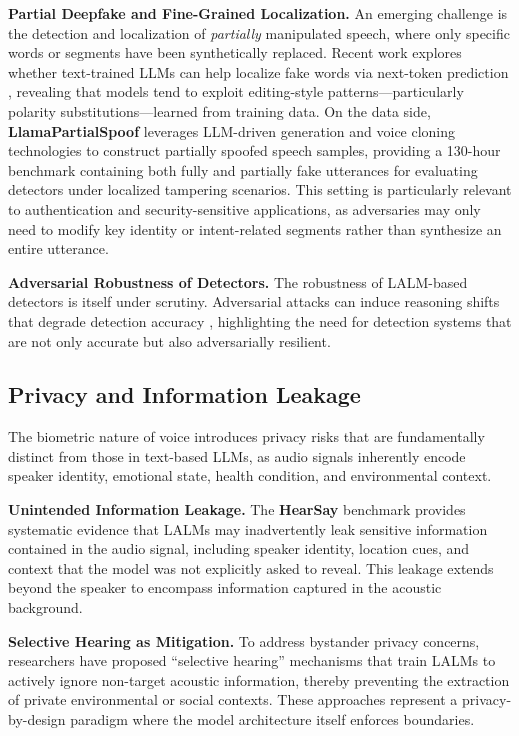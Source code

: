 \textbf{Partial Deepfake and Fine-Grained Localization.} An emerging challenge is the detection and localization of \textit{partially} manipulated speech, where only specific words or segments have been synthetically replaced. Recent work explores whether text-trained LLMs can help localize fake words via next-token prediction \cite{zhang2026can}, revealing that models tend to exploit editing-style patterns---particularly polarity substitutions---learned from training data. On the data side, \textbf{LlamaPartialSpoof} \cite{luong2025llamapartialspoof} leverages LLM-driven generation and voice cloning technologies to construct partially spoofed speech samples, providing a 130-hour benchmark containing both fully and partially fake utterances for evaluating detectors under localized tampering scenarios. This setting is particularly relevant to authentication and security-sensitive applications, as adversaries may only need to modify key identity or intent-related segments rather than synthesize an entire utterance.
 
\textbf{Adversarial Robustness of Detectors.} The robustness of LALM-based detectors is itself under scrutiny. Adversarial attacks can induce reasoning shifts that degrade detection accuracy \cite{nguyen2026analyzing}, highlighting the need for detection systems that are not only accurate but also adversarially resilient.

\subsection{Privacy and Information Leakage}
The biometric nature of voice introduces privacy risks that are fundamentally distinct from those in text-based LLMs, as audio signals inherently encode speaker identity, emotional state, health condition, and environmental context.

\textbf{Unintended Information Leakage.} The \textbf{HearSay} benchmark \cite{wang2026hearsay} provides systematic evidence that LALMs may inadvertently leak sensitive information contained in the audio signal, including speaker identity, location cues, and context that the model was not explicitly asked to reveal. This leakage extends beyond the speaker to encompass information captured in the acoustic background.

\textbf{Selective Hearing as Mitigation.} To address bystander privacy concerns, researchers have proposed ``selective hearing'' mechanisms \cite {zhan2025protecting} that train LALMs to actively ignore non-target acoustic information, thereby preventing the extraction of private environmental or social contexts. These approaches represent a privacy-by-design paradigm where the model architecture itself enforces boundaries.

